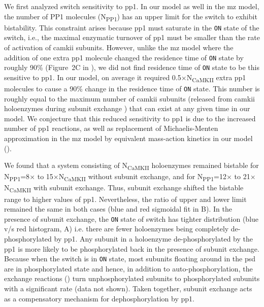 \documentclass[9pt,lineno,doublespacing]{elife}
\newcommand\SUB[2]{#1\textsubscript{#2}}
\begin{document}
We first analyzed switch sensitivity to \gls{pp1}. In our model as well in the
\gls{mz} model, the number of PP1 molecules (\SUB{N}{PP1}) has an upper limit
for the switch to exhibit bistability. This constraint arises because \gls{pp1}
must saturate in the \texttt{ON} state of the switch, i.e., the maximal
enzymatic turnover of \gls{pp1} must be smaller than the rate of activation of
\gls{camkii} subunits.  However, unlike the \gls{mz} model where the addition of
one extra \gls{pp1} molecule changed the residence time of \texttt{ON} state by
roughly 90\% (Figure~2C in \citep{miller_stability_2005}), we did not find
residence time of \texttt{ON} state to be this sensitive to \gls{pp1}. In our
model, on average it required 0.5$\times$\SUB{N}{CaMKII} extra \gls{pp1}
molecules to cause a 90\% change in the residence time of \texttt{ON} state.
This number is roughly equal to the maximum number of \gls{camkii} subunits
(released from \gls{camkii} holoenzymes during subunit exchange )
that can exist at any given time in our model. We
conjecture that this reduced sensitivity to \gls{pp1} is due to the increased
number of \gls{pp1} reactions, as well as replacement of Michaelis-Menten
approximation in the \gls{mz} model by equivalent mass-action kinetics in our
model (). 

We found that a system consisting of \SUB{N}{CaMKII} holoenzymes remained
bistable for \SUB{N}{PP1}=8$\times$ to 15$\times$\SUB{N}{CaMKII} without subunit
exchange, and for \SUB{N}{PP1}=12$\times$ to 21$\times$\SUB{N}{CaMKII} with
subunit exchange. Thus, subunit exchange shifted the bistable range to higher
values of \gls{pp1}. Nevertheless, the ratio of upper and lower limit remained
the same in both cases (blue and red sigmoidal fit in B). In
the presence of subunit exchange, the \texttt{ON} state of switch has tighter
distribution (blue v/s red histogram, A) i.e. there are fewer
holoenzymes being completely de-phosphorylated by \gls{pp1}. Any subunit in a
holoenzyme de-phosphorylated by the \gls{pp1} is more likely to be
phosphorylated back in the presence of subunit exchange. Because when the switch
is in \texttt{ON} state, most subunits floating around in the \gls{psd} are in
phosphorylated state and hence, in addition to auto-phosphorylation, the
exchange reactions () turn unphosphorylated subunits to
phosphorylated subunits with a significant rate (data not shown). Taken
together, subunit exchange acts as a compensatory mechanism for
dephosphorylation by \gls{pp1}.
\end{document}

